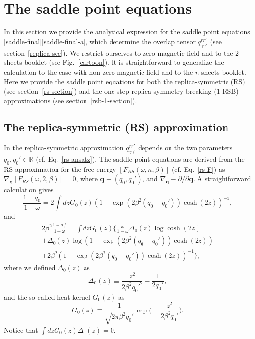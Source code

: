 \documentclass[twocolumn,superscriptaddress,prb,10pt]{revtex4-1}
\begin{document}
\appendix

\section{The saddle point equations} 
\label{saddle-equations}

In this section we provide the analytical expression for the saddle point equations 
\eqref{saddle-final}\eqref{saddle-final-a}, which determine the overlap tensor 
$q_{\gamma\gamma'}^{rr'}$ (see section~\ref{replica-sec}). We restrict ourselves 
to zero magnetic field and to the $2$-sheets booklet (see Fig.~\ref{cartoon}). It is 
straightforward to generalize the calculation to the case with non zero magnetic 
field and to the $n$-sheets booklet. Here we provide the saddle point equations 
for both the replica-symmetric (RS) (see section~\ref{rs-section}) and the one-step 
replica symmetry breaking ($1$-RSB) approximations (see section~\ref{rsb-1-section}). 

\subsection{The replica-symmetric (RS) approximation}

In the replica-symmetric approximation $q_{\gamma\gamma'}^{rr'}$ depends on the two 
parameters $q_0,q_0'\in\mathbb{R}$ (cf. Eq.~\eqref{rs-ansatz}). The saddle point 
equations are derived from the RS approximation for the free energy $[F_{RS}
(\omega,n,\beta)]$ (cf. Eq.~\eqref{rs-F}) as $\nabla_{\mathbf{q}}[F_{RS}(\omega,2,
\beta)]=0$, where $\mathbf{q}\equiv(q_0,q_0')$, and $\nabla_{\mathbf{q}}\equiv
\partial/\partial\mathbf{q}$. A straightforward calculation gives 
%
\begin{equation}
\label{RS-saddle-1}
\frac{1-q_0}{1-\omega}=2\int dz G_0(z)(1+\exp(2\beta^2(q_0-q_0'))\cosh(2z))^{-1},
\end{equation}
%
and
%
\begin{multline}
\label{RS-saddle-2}
2\beta^2\frac{1-q_0'}{1-\omega}=
\int dz G_0(z)\Big\{\frac{\omega}{1-\omega}\Delta_0(z)
\log\cosh(2z)\\
+\Delta_0(z)\log(1+\exp(2\beta^2(q_0-q_0'))\cosh(2z))\\
+2\beta^2(1+\exp(2\beta^2(q_0-q_0'))\cosh(2z))^{-1}
\Big\},
\end{multline}
%
where we defined $\Delta_0(z)$ as 
%
\begin{equation}
\Delta_0(z)\equiv\frac{z^2}{2\beta^2q_0'^2}-\frac{1}{2q_0'},
\end{equation}
%
and the so-called heat kernel $G_0(z)$ as 
%
\begin{equation}
G_0(z)\equiv\frac{1}{\sqrt{2\pi \beta^2 q_0'}}\exp\Big(-\frac{z^2}
{2\beta^2 q_0'}\Big).
\end{equation}
%
Notice that $\int dz G_0(z)\Delta_0(z)=0$.
\end{document}
